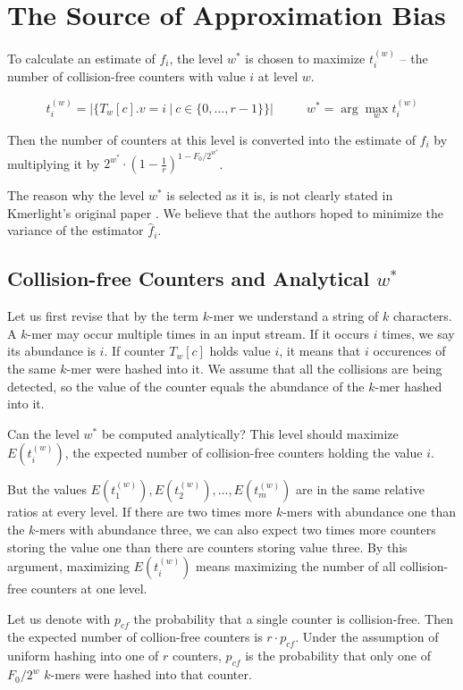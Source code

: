 \section{The Source of Approximation Bias}
\label{sec:source-of-bias}

To calculate an estimate of $f_i$, the level $w^*$ is chosen
to maximize $t_i^{(w)}$ -- the number of collision-free counters with value $i$ at level $w$.

$$t_i^{(w)} = |\{T_w[c].v = i ~|~ c \in \{0, \dots, r-1\}\}| ~~~~~~~~~~~~ w^* = \arg\max_w t_i^{(w)}$$

Then the number of counters at this level is converted into the estimate of $f_i$ by multiplying it by 
$2^{w^*} \cdot \left(1 - \frac{1}{r}\right)^{1 - F_0/2^{w^*}}$. 

The reason why the level $w^*$ is selected as it is, is not clearly stated in Kmerlight's original paper \cite{Sivadasan2016}. 
We believe that the authors hoped to minimize the variance of the estimator $\hat f_i$.

\subsection{Collision-free Counters and Analytical $w^*$}
\label{sec:analytical-w}
Let us first revise that by the term $k$-mer we understand a string of $k$ characters. A $k$-mer may occur multiple times in an input stream. 
If it occurs $i$ times, we say its abundance is $i$. If counter $T_w[c]$ holds value $i$, it means that $i$ occurences of the same $k$-mer were hashed into it.
We assume that all the collisions are being detected, so the value of the counter equals the abundance of the $k$-mer hashed into it.

Can the level $w^*$ be computed analytically? This level should maximize $E(t_i^{(w)})$, the expected number of collision-free counters holding the value $i$.

But the values $E(t_1^{(w)}), E(t_2^{(w)}), \dots, E(t_m^{(w)})$ are in the same relative ratios at every level. If there are two times more $k$-mers with
abundance one than the $k$-mers with abundance three, we can also expect two times more counters storing the value one than there are counters storing value three.
By this argument, maximizing $E(t_i^{(w)})$ means maximizing the number of all collision-free counters at one level.

Let us denote with $p_{cf}$ the probability that a single counter is collision-free. Then the expected number of collion-free counters is $r \cdot p_{cf}$.
Under the assumption of uniform hashing into one of $r$ counters, $p_{cf}$ is the probability that only one of $F_0/2^w$ $k$-mers were hashed into that counter.

